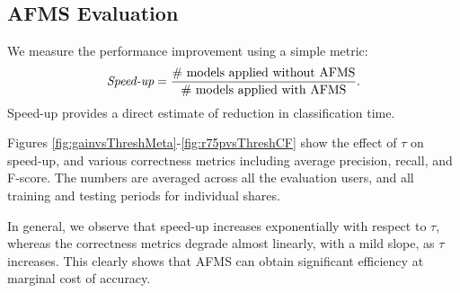 
\subsection{AFMS Evaluation}
\label{sec:exptspeedup}
We measure the performance improvement using a simple metric:
\begin{equation}
\label{eq:speedupgain} 
\mbox{{\it Speed-up}} = \frac{\mbox{\# models applied without AFMS}}{\mbox{\# models applied with AFMS}}.
\end{equation}
Speed-up provides a direct estimate of reduction in classification
time.


\begin{figure}
\begin{minipage}{.49\textwidth}
\centering
{}

\label{fig:gainvsThreshMeta}
\end{minipage}
\begin{minipage}{.49\textwidth}
\centering
{}

\label{fig:gainvsThreshCF}
\end{minipage}

\end{figure}


Figures \ref{fig:gainvsThreshMeta}-\ref{fig:r75pvsThreshCF} show the
effect of $\tau$ on speed-up, and various correctness metrics including
average precision, recall, and F-score.  The numbers are averaged across all
the evaluation users, and all training and testing periods for
individual shares.

In general, we observe that speed-up increases exponentially with
respect to $\tau$, whereas the correctness metrics degrade almost linearly,
with a mild slope, as $\tau$ increases.  This clearly shows that AFMS
can obtain significant efficiency at marginal cost of accuracy.



